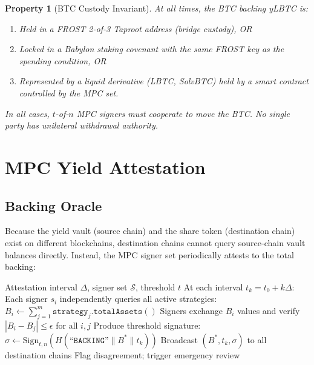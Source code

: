 \documentclass[11pt,twocolumn]{article}
\newtheorem{property}{Property}[section]
\begin{document}
\begin{property}[BTC Custody Invariant]
At all times, the BTC backing yLBTC is:
\begin{enumerate}[nosep]
  \item Held in a FROST 2-of-3 Taproot address (bridge custody), OR
  \item Locked in a Babylon staking covenant with the same FROST key as the spending condition, OR
  \item Represented by a liquid derivative (LBTC, SolvBTC) held by a smart contract controlled by the MPC set.
\end{enumerate}
In all cases, $t$-of-$n$ MPC signers must cooperate to move the BTC. No single party has unilateral withdrawal authority.
\end{property}

\section{MPC Yield Attestation}\label{sec:attestation}

\subsection{Backing Oracle}

Because the yield vault (source chain) and the share token (destination chain) exist on different blockchains, destination chains cannot query source-chain vault balances directly. Instead, the MPC signer set periodically attests to the total backing:

\begin{algorithm}[H]
\caption{MPC Backing Attestation}
\label{alg:attestation}
\begin{algorithmic}[1]
\Require Attestation interval $\Delta$, signer set $\mathcal{S}$, threshold $t$
\State At each interval $t_k = t_0 + k\Delta$:
\State Each signer $s_i$ independently queries all active strategies:
\State \quad $B_i \leftarrow \sum_{j=1}^{m} \texttt{strategy}_j.\texttt{totalAssets}()$
\State Signers exchange $B_i$ values and verify $|B_i - B_j| \leq \epsilon$ for all $i, j$
  \State Produce threshold signature: $\sigma \leftarrow \text{Sign}_{t,n}(H(\texttt{``BACKING''} \| B^* \| t_k))$
  \State Broadcast $(B^*, t_k, \sigma)$ to all destination chains
\Else
  \State Flag disagreement; trigger emergency review
\EndIf
\end{algorithmic}
\end{algorithm}
\end{document}

